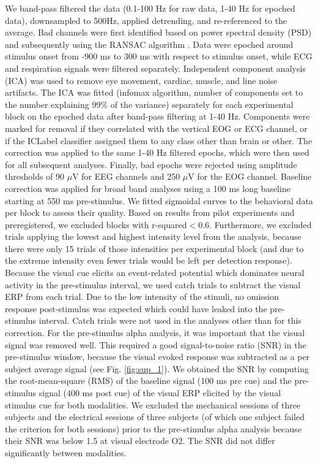 \documentclass[11pt,a4paper,onecolumn]{article}
\begin{document}
We band-pass filtered the data (0.1-100 Hz for raw data, 1-40 Hz for epoched data), downsampled to 500Hz, applied detrending, and re-referenced to the average. Bad channels were first identified based on power spectral density (PSD) and subsequently using the RANSAC algorithm \cite{jasAutorejectAutomatedArtifact2017}. Data were epoched around stimulus onset from -900 ms to 300 ms with respect to stimulus onset, while ECG and respiration signals were filtered separately. Independent component analysis (ICA) was used to remove eye movement, cardiac, muscle, and line noise artifacts. The ICA was fitted (infomax algorithm, number of components set to the number explaining 99\% of the variance) separately for each experimental block on the epoched data after band-pass filtering at 1-40 Hz. Components were marked for removal if they correlated with the vertical EOG or ECG channel, or if the ICLabel classifier \cite{pion-tonachini_iclabel_2019} assigned them to any class other than brain or other. The correction was applied to the same 1-40 Hz filtered epochs, which were then used for all subsequent analyses. Finally, bad epochs were rejected using amplitude thresholds of 90 $\mu$V for EEG channels and 250 $\mu$V for the EOG channel. Baseline correction was applied for broad band analyses using a 100 ms long baseline starting at 550 ms pre-stimulus. We fitted sigmoidal curves to the behavioral data per block to assess their quality. Based on results from pilot experiments and preregistered, we excluded blocks with r-squared$<$0.6. Furthermore, we excluded trials applying the lowest and highest intensity level from the analysis, because there were only 15 trials of those intensities per experimental block (and due to the extreme intensity even fewer trials would be left per detection response). Because the visual cue elicits an event-related potential which dominates neural activity in the pre-stimulus interval, we used catch trials to subtract the visual ERP from each trial. Due to the low intensity of the stimuli, no omission response post-stimulus was expected which could have leaked into the pre-stimulus interval. Catch trials were not used in the analyses other than for this correction. For the pre-stimulus alpha analysis, it was important that the visual signal was removed well. This required a good signal-to-noise ratio (SNR) in the pre-stimulus window, because the visual evoked response was subtracted as a per subject average signal (see Fig. \ref{fig:sup_1}). We obtained the SNR by computing the root-mean-square (RMS) of the baseline signal (100 ms pre cue) and the pre-stimulus signal (400 ms post cue) of the visual ERP elicited by the visual stimulus cue for both modalities. We excluded the mechanical sessions of three subjects and the electrical sessions of three subjects (of which one subject failed the criterion for both sessions) prior to the pre-stimulus alpha analysis because their SNR was below 1.5 at visual electrode O2. The SNR did not differ significantly between modalities.
\end{document}

